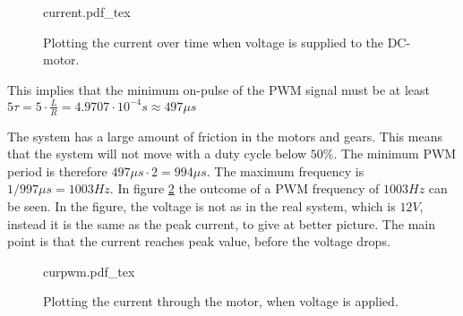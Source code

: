 \documentclass[../../../Main]{subfiles}
\begin{document}
\begin{figure}[H]
\centering
\def\svgwidth{\textwidth}
{current.pdf_tex}
\caption{Plotting the current over time when voltage is supplied to the DC-motor.}
\label{fig:currentplot}
\end{figure}

This implies that the minimum on-pulse of the PWM signal must be at least $5\tau = 5 \cdot \frac{L}{R} = 4.9707 \cdot 10^{-4}s \approx 497\mu s$

The system has a large amount of friction in the motors and gears. This means that the system will not move with a duty cycle below $50\%$. The minimum PWM period is therefore $497\mu s \cdot 2 = 994\mu s$. The maximum frequency is $1/997\mu s = 1003 Hz$.
In figure \ref{fig:currentplot_pwm} the outcome of a PWM frequency of $1003Hz$ can be seen.
In the figure, the voltage is not as in the real system, which is $12V$, instead it is the same as the peak current, to give at better picture. The main point is that the current reaches peak value, before the voltage drops.

\begin{figure}[H]
\centering
\def\svgwidth{\textwidth}
{curpwm.pdf_tex}
\caption{Plotting the current through the motor, when voltage is applied.}
\label{fig:currentplot_pwm}
\end{figure}
\end{document}
